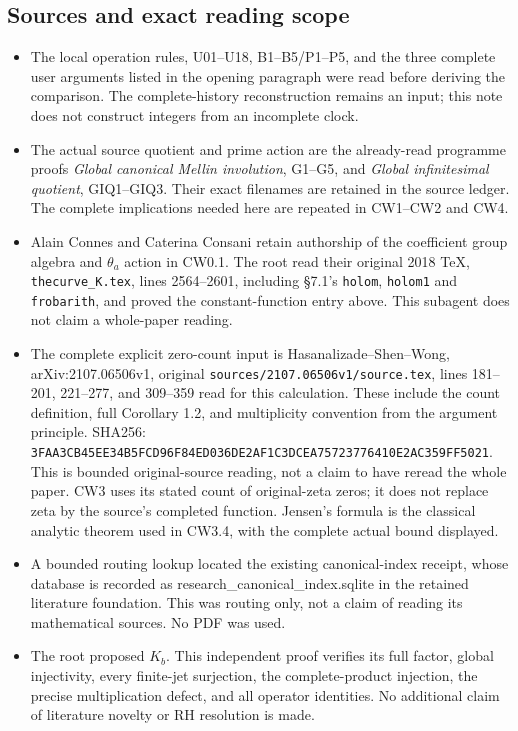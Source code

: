 \subsection{Sources and exact reading
scope}\label{sources-and-exact-reading-scope}

\begin{itemize}
\tightlist
\item
  The local operation rules, U01--U18, B1--B5/P1--P5, and the three
  complete user arguments listed in the opening paragraph were read
  before deriving the comparison. The complete-history reconstruction
  remains an input; this note does not construct integers from an
  incomplete clock.
\item
  The actual source quotient and prime action are the already-read
  programme proofs \emph{Global canonical Mellin involution}, G1--G5,
  and \emph{Global infinitesimal quotient}, GIQ1--GIQ3. Their exact
  filenames are retained in the source ledger. The complete implications
  needed here are repeated in CW1--CW2 and CW4.
\item
  Alain Connes and Caterina Consani retain authorship of the coefficient
  group algebra and \(\theta_a\) action in CW0.1. The root read their
  original 2018 TeX, \nolinkurl{thecurve_K.tex}, lines 2564--2601,
  including §7.1's \texttt{holom}, \texttt{holom1} and
  \texttt{frobarith}, and proved the constant-function entry above. This
  subagent does not claim a whole-paper reading.
\item
  The complete explicit zero-count input is Hasanalizade--Shen--Wong,
  arXiv:2107.06506v1, original \nolinkurl{sources/2107.06506v1/source.tex},
  lines 181--201, 221--277, and 309--359 read for this calculation.
  These include the count definition, full Corollary 1.2, and
  multiplicity convention from the argument principle. SHA256:
  \nolinkurl{3FAA3CB45EE34B5FCD96F84ED036DE2AF1C3DCEA75723776410E2AC359FF5021}.
  This is bounded original-source reading, not a claim to have reread
  the whole paper. CW3 uses its stated count of original-zeta zeros; it
  does not replace zeta by the source's completed function. Jensen's
  formula is the classical analytic theorem used in CW3.4, with the
  complete actual bound displayed.
\item
  A bounded routing lookup located the existing canonical-index receipt,
  whose database is recorded as research\_canonical\_index.sqlite in the
  retained literature foundation. This was routing only, not a claim of
  reading its mathematical sources. No PDF was used.
\item
  The root proposed \(K_b\). This independent proof verifies its full
  factor, global injectivity, every finite-jet surjection, the
  complete-product injection, the precise multiplication defect, and all
  operator identities. No additional claim of literature novelty or RH
  resolution is made.
\end{itemize}

